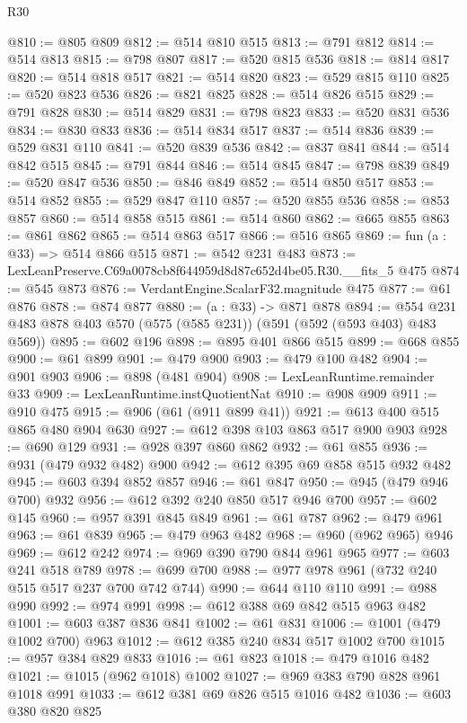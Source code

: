 \begin{lexlean}{R30}
\begin{coremodule}
@810 := @805 @809
@812 := @514 @810 @515
@813 := @791 @812
@814 := @514 @813
@815 := @798 @807
@817 := @520 @815 @536
@818 := @814 @817
@820 := @514 @818 @517
@821 := @514 @820
@823 := @529 @815 @110
@825 := @520 @823 @536
@826 := @821 @825
@828 := @514 @826 @515
@829 := @791 @828
@830 := @514 @829
@831 := @798 @823
@833 := @520 @831 @536
@834 := @830 @833
@836 := @514 @834 @517
@837 := @514 @836
@839 := @529 @831 @110
@841 := @520 @839 @536
@842 := @837 @841
@844 := @514 @842 @515
@845 := @791 @844
@846 := @514 @845
@847 := @798 @839
@849 := @520 @847 @536
@850 := @846 @849
@852 := @514 @850 @517
@853 := @514 @852
@855 := @529 @847 @110
@857 := @520 @855 @536
@858 := @853 @857
@860 := @514 @858 @515
@861 := @514 @860
@862 := @665 @855
@863 := @861 @862
@865 := @514 @863 @517
@866 := @516 @865
@869 := fun (a : @33) => @514 @866 @515
@871 := @542 @231 @483
@873 := LexLeanPreserve.C69a0078cb8f644959d8d87c652d4be05.R30.__fits_5 @475
@874 := @545 @873
@876 := VerdantEngine.ScalarF32.magnitude @475
@877 := @61 @876
@878 := @874 @877
@880 := (a : @33) -> @871 @878
@894 := @554 @231 @483 @878 @403 @570 (@575 (@585 @231)) (@591 (@592 (@593 @403) @483 @569))
@895 := @602 @196
@898 := @895 @401 @866 @515
@899 := @668 @855
@900 := @61 @899
@901 := @479 @900
@903 := @479 @100 @482
@904 := @901 @903
@906 := @898 (@481 @904)
@908 := LexLeanRuntime.remainder @33
@909 := LexLeanRuntime.instQuotientNat
@910 := @908 @909
@911 := @910 @475
@915 := @906 (@61 (@911 @899 @41))
@921 := @613 @400 @515 @865 @480 @904 @630
@927 := @612 @398 @103 @863 @517 @900 @903
@928 := @690 @129
@931 := @928 @397 @860 @862
@932 := @61 @855
@936 := @931 (@479 @932 @482) @900
@942 := @612 @395 @69 @858 @515 @932 @482
@945 := @603 @394 @852 @857
@946 := @61 @847
@950 := @945 (@479 @946 @700) @932
@956 := @612 @392 @240 @850 @517 @946 @700
@957 := @602 @145
@960 := @957 @391 @845 @849
@961 := @61 @787
@962 := @479 @961
@963 := @61 @839
@965 := @479 @963 @482
@968 := @960 (@962 @965) @946
@969 := @612 @242
@974 := @969 @390 @790 @844 @961 @965
@977 := @603 @241 @518 @789
@978 := @699 @700
@988 := @977 @978 @961 (@732 @240 @515 @517 @237 @700 @742 @744)
@990 := @644 @110 @110
@991 := @988 @990
@992 := @974 @991
@998 := @612 @388 @69 @842 @515 @963 @482
@1001 := @603 @387 @836 @841
@1002 := @61 @831
@1006 := @1001 (@479 @1002 @700) @963
@1012 := @612 @385 @240 @834 @517 @1002 @700
@1015 := @957 @384 @829 @833
@1016 := @61 @823
@1018 := @479 @1016 @482
@1021 := @1015 (@962 @1018) @1002
@1027 := @969 @383 @790 @828 @961 @1018 @991
@1033 := @612 @381 @69 @826 @515 @1016 @482
@1036 := @603 @380 @820 @825

\end{coremodule}
\end{lexlean}

